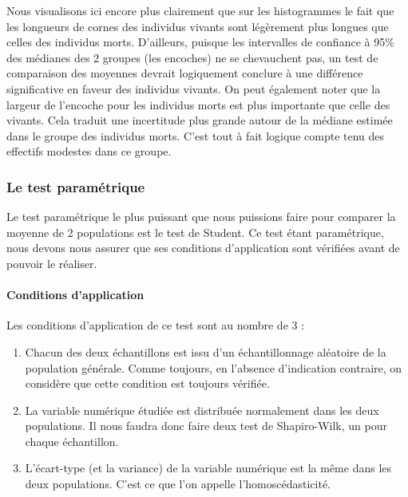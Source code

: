 \documentclass[a4paperpaper,]{article}
\providecommand{\tightlist}{%
  \setlength{\itemsep}{0pt}\setlength{\parskip}{0pt}}
\let\oldparagraph\paragraph
\renewcommand{\paragraph}[1]{\oldparagraph{#1}\mbox{}}
\begin{document}
Nous visualisons ici encore plus clairement que sur les histogrammes le fait que les longueurs de cornes des individus vivants sont légèrement plus longues que celles des individus morts. D'ailleurs, puisque les intervalles de confiance à 95\% des médianes des 2 groupes (les encoches) ne se chevauchent pas, un test de comparaison des moyennes devrait logiquement conclure à une différence significative en faveur des individus vivants. On peut également noter que la largeur de l'encoche pour les individus morts est plus importante que celle des vivants. Cela traduit une incertitude plus grande autour de la médiane estimée dans le groupe des individus morts. C'est tout à fait logique compte tenu des effectifs modestes dans ce groupe.

\hypertarget{le-test-paramuxe9trique-2}{%
\subsubsection{Le test paramétrique}\label{le-test-paramuxe9trique-2}}

Le test paramétrique le plus puissant que nous puissions faire pour comparer la moyenne de 2 populations est le test de Student. Ce test étant paramétrique, nous devons nous assurer que ses conditions d'application sont vérifiées avant de pouvoir le réaliser.

\hypertarget{conditions-dapplication-2}{%
\paragraph{Conditions d'application}\label{conditions-dapplication-2}}

Les conditions d'application de ce test sont au nombre de 3 :

\begin{enumerate}
\def\labelenumi{\arabic{enumi}.}
\tightlist
\item
  Chacun des deux échantillons est issu d'un échantillonnage aléatoire de la population générale. Comme toujours, en l'absence d'indication contraire, on considère que cette condition est toujours vérifiée.
\item
  La variable numérique étudiée est distribuée normalement dans les deux populations. Il nous faudra donc faire deux test de Shapiro-Wilk, un pour chaque échantillon.
\item
  L'écart-type (et la variance) de la variable numérique est la même dans les deux populations. C'est ce que l'on appelle l'homoscédasticité.
\end{enumerate}
\end{document}

